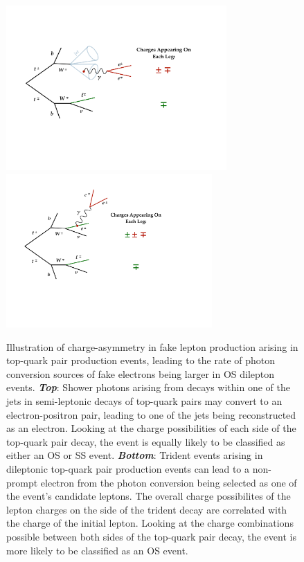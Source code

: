 \begin{figure}[!htb]
    \begin{center}
        \includegraphics[width=0.75\textwidth]{figures/common_ana/fakes/ttbar_fake_charge_sym_semi}
        \includegraphics[width=0.7\textwidth]{figures/common_ana/fakes/ttbar_fake_charge_sym_trident}
        \caption{
            Illustration of charge-asymmetry in fake lepton production
            arising in top-quark pair production events, leading to
            the rate of photon conversion sources of fake electrons being larger in OS dilepton events.
            \textbf{\textit{Top}}: Shower photons arising from decays within one of the jets
                in semi-leptonic decays of top-quark pairs may convert to an electron-positron pair,
                leading to one of the jets being reconstructed as an electron.
                Looking at the charge possibilities of each side of the top-quark pair decay,
                the event is equally likely to be classified as either an OS or SS event.
            \textbf{\textit{Bottom}}: Trident events arising in dileptonic top-quark pair production
                events can lead to a non-prompt electron from the photon conversion being selected
                as one of the event's candidate leptons.
                The overall charge possibilites of the lepton charges on the side of the trident decay
                are correlated with the charge of the initial lepton.
                Looking at the charge combinations possible between both sides of the top-quark pair decay,
                the event is more likely to be classified as an OS event.
        }
        \label{fig:ttbar_fake_charge_sym}
    \end{center}
\end{figure}

